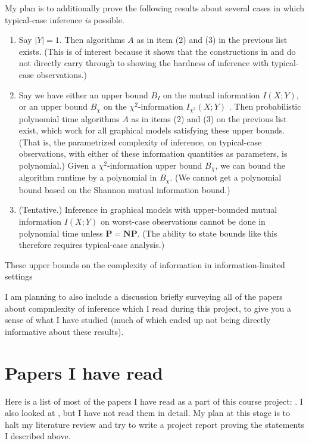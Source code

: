 \documentclass{article}
\renewcommand{\P}{\mathbf{P}}
\newcommand{\NP}{\mathbf{NP}}
\begin{document}
My plan is to additionally prove the following results about several cases in which typical-case inference \textit{is} possible.
\begin{enumerate}
    \item Say $|Y| = 1$.  Then algorithms $A$ as in item (2) and (3) in the previous list exists.  (This is of interest because it shows that the constructions in \cite{cooper1990} and \cite{dagum1993} do not directly carry through to showing the hardness of inference with typical-case observations.)
    \item Say we have either an upper bound $B_I$ on the mutual information $I(X ; Y)$, or an upper bound $B_\chi$ on the $\chi^2$-information $I_{\chi^2}(X; Y)$ \cite{f_information}. Then probabilistic polynomial time algorithms $A$ as in items (2) and (3) on the previous list exist, which work for all graphical models satisfying these upper bounds.  (That is, the parametrized complexity of inference, on typical-case observations, with either of these information quantities as parameters, is polynomial.)  Given a $\chi^2$-information upper bound $B_\chi$, we can bound the algorithm runtime by a polynomial in $B_\chi$.  (We cannot get a polynomial bound based on the Shannon mutual information bound.)
    \item (Tentative.) Inference in graphical models with upper-bounded mutual information $I(X; Y)$ on worst-case observations cannot be done in polynomial time unless $\P = \NP$.
    (The ability to state bounds like this therefore requires typical-case analysis.)
\end{enumerate}
These upper bounds on the complexity of information in information-limited settings 


I am planning to also include a discussion briefly surveying all of the papers about compmlexity of inference which I read during this project, to give you a sense of what I have studied (much of which ended up not being directly informative about these results).


\section{Papers I have read}
Here is a list of most of the papers I have read as a part of this course project: \cite{jerrum1986, cooper1990, dagum1993, dagum1997optimal, ackerman2019computability, kwisthout2018approximate, akmal2022majority, tantau2022satisfaction, aaronson2014equivalence}.
I also looked at \cite{feige2002relations, moitra2019approximate}, but I have not read them in detail.
My plan at this stage is to halt my literature review and try to write a project report
proving the statements I described above.
\end{document}
